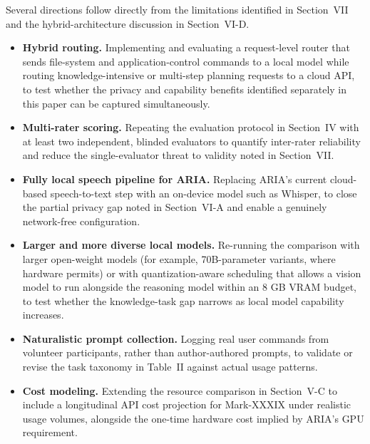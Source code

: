 \documentclass[conference]{IEEEtran}
\begin{document}
Several directions follow directly from the limitations identified in Section~VII and the hybrid-architecture discussion in Section~VI-D.

\begin{itemize}
\item \textbf{Hybrid routing.} Implementing and evaluating a request-level router that sends file-system and application-control commands to a local model while routing knowledge-intensive or multi-step planning requests to a cloud API, to test whether the privacy and capability benefits identified separately in this paper can be captured simultaneously.
\item \textbf{Multi-rater scoring.} Repeating the evaluation protocol in Section~IV with at least two independent, blinded evaluators to quantify inter-rater reliability and reduce the single-evaluator threat to validity noted in Section~VII.
\item \textbf{Fully local speech pipeline for ARIA.} Replacing ARIA's current cloud-based speech-to-text step with an on-device model such as Whisper, to close the partial privacy gap noted in Section~VI-A and enable a genuinely network-free configuration.
\item \textbf{Larger and more diverse local models.} Re-running the comparison with larger open-weight models (for example, 70B-parameter variants, where hardware permits) or with quantization-aware scheduling that allows a vision model to run alongside the reasoning model within an 8 GB VRAM budget, to test whether the knowledge-task gap narrows as local model capability increases.
\item \textbf{Naturalistic prompt collection.} Logging real user commands from volunteer participants, rather than author-authored prompts, to validate or revise the task taxonomy in Table~II against actual usage patterns.
\item \textbf{Cost modeling.} Extending the resource comparison in Section~V-C to include a longitudinal API cost projection for Mark-XXXIX under realistic usage volumes, alongside the one-time hardware cost implied by ARIA's GPU requirement.
\end{itemize}
\end{document}
